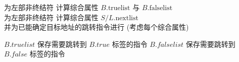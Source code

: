 \begin{frame}{}
  \begin{center}
    为左部非终结符  计算综合属性 $B.\text{truelist}$ 与 $B.\text{falselist}$ \\[10pt]
    为左部非终结符  计算综合属性 $S/L.\text{nextlist}$ \\[15pt]
    并为已能确定目标地址的跳转指令进行 (考虑每个综合属性)
  \end{center}
\end{frame}


\begin{frame}{}
  \begin{center}
  \end{center}
\end{frame}

\begin{frame}{}
  \begin{center}
    {$B.\mathit{truelist}$ 保存{需要跳转到 $B.\mathit{true}$ 标签}的{指令}}
    {$B.\mathit{falselist}$ 保存{需要跳转到 $B.\mathit{false}$ 标签}的{指令}}

    \pause
    \vspace{1.00cm}
  \end{center}
\end{frame}

\begin{frame}{}
  \begin{center}

    \pause
    \vspace{2.00cm}
  \end{center}
\end{frame}

